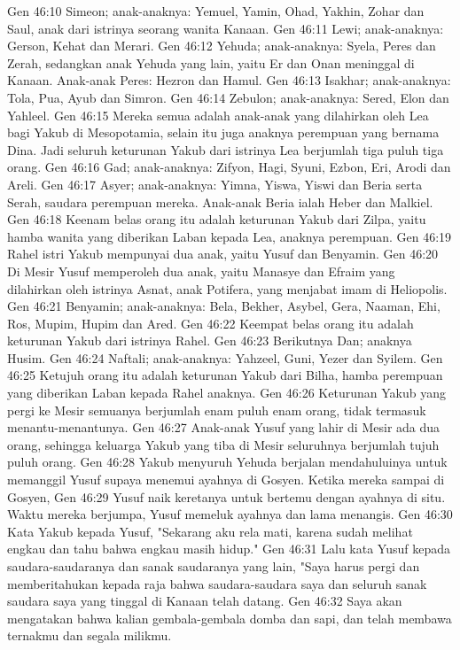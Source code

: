 Gen 46:10  Simeon; anak-anaknya: Yemuel, Yamin, Ohad, Yakhin, Zohar dan Saul, anak dari istrinya seorang wanita Kanaan.
Gen 46:11  Lewi; anak-anaknya: Gerson, Kehat dan Merari.
Gen 46:12  Yehuda; anak-anaknya: Syela, Peres dan Zerah, sedangkan anak Yehuda yang lain, yaitu Er dan Onan meninggal di Kanaan. Anak-anak Peres: Hezron dan Hamul.
Gen 46:13  Isakhar; anak-anaknya: Tola, Pua, Ayub dan Simron.
Gen 46:14  Zebulon; anak-anaknya: Sered, Elon dan Yahleel.
Gen 46:15  Mereka semua adalah anak-anak yang dilahirkan oleh Lea bagi Yakub di Mesopotamia, selain itu juga anaknya perempuan yang bernama Dina. Jadi seluruh keturunan Yakub dari istrinya Lea berjumlah tiga puluh tiga orang.
Gen 46:16  Gad; anak-anaknya: Zifyon, Hagi, Syuni, Ezbon, Eri, Arodi dan Areli.
Gen 46:17  Asyer; anak-anaknya: Yimna, Yiswa, Yiswi dan Beria serta Serah, saudara perempuan mereka. Anak-anak Beria ialah Heber dan Malkiel.
Gen 46:18  Keenam belas orang itu adalah keturunan Yakub dari Zilpa, yaitu hamba wanita yang diberikan Laban kepada Lea, anaknya perempuan.
Gen 46:19  Rahel istri Yakub mempunyai dua anak, yaitu Yusuf dan Benyamin.
Gen 46:20  Di Mesir Yusuf memperoleh dua anak, yaitu Manasye dan Efraim yang dilahirkan oleh istrinya Asnat, anak Potifera, yang menjabat imam di Heliopolis.
Gen 46:21  Benyamin; anak-anaknya: Bela, Bekher, Asybel, Gera, Naaman, Ehi, Ros, Mupim, Hupim dan Ared.
Gen 46:22  Keempat belas orang itu adalah keturunan Yakub dari istrinya Rahel.
Gen 46:23  Berikutnya Dan; anaknya Husim.
Gen 46:24  Naftali; anak-anaknya: Yahzeel, Guni, Yezer dan Syilem.
Gen 46:25  Ketujuh orang itu adalah keturunan Yakub dari Bilha, hamba perempuan yang diberikan Laban kepada Rahel anaknya.
Gen 46:26  Keturunan Yakub yang pergi ke Mesir semuanya berjumlah enam puluh enam orang, tidak termasuk menantu-menantunya.
Gen 46:27  Anak-anak Yusuf yang lahir di Mesir ada dua orang, sehingga keluarga Yakub yang tiba di Mesir seluruhnya berjumlah tujuh puluh orang.
Gen 46:28  Yakub menyuruh Yehuda berjalan mendahuluinya untuk memanggil Yusuf supaya menemui ayahnya di Gosyen. Ketika mereka sampai di Gosyen,
Gen 46:29  Yusuf naik keretanya untuk bertemu dengan ayahnya di situ. Waktu mereka berjumpa, Yusuf memeluk ayahnya dan lama menangis.
Gen 46:30  Kata Yakub kepada Yusuf, "Sekarang aku rela mati, karena sudah melihat engkau dan tahu bahwa engkau masih hidup."
Gen 46:31  Lalu kata Yusuf kepada saudara-saudaranya dan sanak saudaranya yang lain, "Saya harus pergi dan memberitahukan kepada raja bahwa saudara-saudara saya dan seluruh sanak saudara saya yang tinggal di Kanaan telah datang.
Gen 46:32  Saya akan mengatakan bahwa kalian gembala-gembala domba dan sapi, dan telah membawa ternakmu dan segala milikmu.
